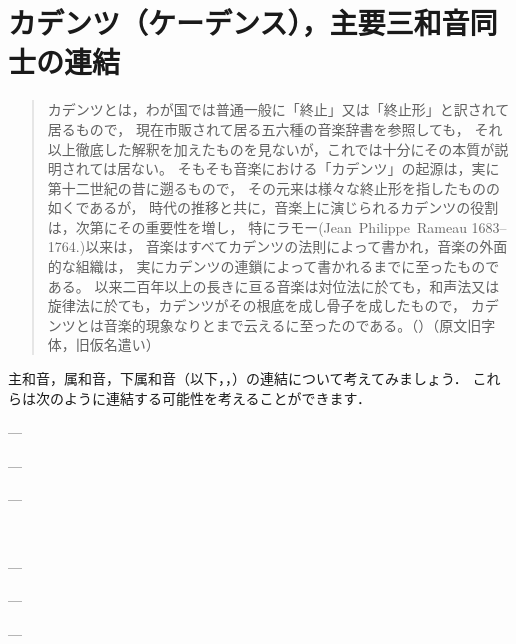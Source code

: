 \documentclass[dvipdfmx,uplatex,b5paper,openany,jbase=12Q,nomag*,textwidth-limit=44%
               ]{gachimuchi}[2020/05/05]
\begin{document}
\section{カデンツ（ケーデンス），主要三和音同士の連結}
\begin{quotation}
カデンツとは，わが国では普通一般に「終止」又は「終止形」と訳されて居るもので，
現在市販されて居る五六種の音楽辞書を参照しても，
それ以上徹底した解釈を加えたものを見ないが，これでは十分にその本質が説明されては居ない。
そもそも音楽における「カデンツ」の起源は，実に第十二世紀の昔に遡るもので，
その元来は様々な終止形を指したものの如くであるが，
時代の推移と共に，音楽上に演じられるカデンツの役割は，次第にその重要性を増し，
特にラモー(Jean~Philippe~Rameau 1683--1764.)以来は，
音楽はすべてカデンツの法則によって書かれ，音楽の外面的な組織は，
実にカデンツの連鎖によって書かれるまでに至ったものである。
以来二百年以上の長きに亘る音楽は対位法に於ても，和声法又は旋律法に於ても，カデンツがその根底を成し骨子を成したもので，
カデンツとは音楽的現象なりとまで云えるに至ったのである。（）（原文旧字体，旧仮名遣い）
\end{quotation}

主和音，属和音，下属和音（以下，，）の連結について考えてみましょう．
これらは次のように連結する可能性を考えることができます\cite[p.22]{chTHUILLE1}．
\begin{enumerate}
  \begin{minipage}{.35\linewidth}\item {}---\end{minipage}%
  \begin{minipage}{.35\linewidth}\item {}---\end{minipage}%
  \begin{minipage}{.3\linewidth }\item {}---\end{minipage}\\%
  \begin{minipage}{.35\linewidth}\item {}---\end{minipage}%
  \begin{minipage}{.35\linewidth}\item {}---\end{minipage}%
  \begin{minipage}{.3\linewidth }\item {}---\end{minipage}%
\end{enumerate}
\end{document}
